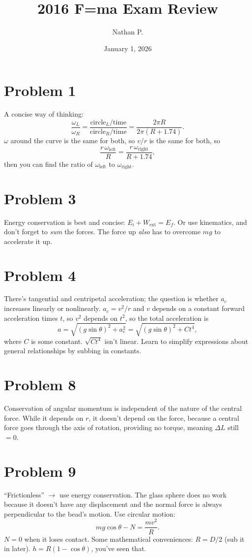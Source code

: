 \documentclass[11pt]{article}
\title{2016 F=ma Exam Review}
\author{Nathan P.}
\date{January 1, 2026}
\begin{document}
\maketitle

\section*{Problem 1}
A concise way of thinking:
\[
\frac{\omega_L}{\omega_R}=\frac{\text{circle}_L/\text{time}}{\text{circle}_R/\text{time}}=\frac{2\pi R}{2\pi(R+1.74)}.
\]
$\omega$ around the curve is the same for both, so $v/r$ is the same for both, so
\[
\frac{r\,\omega_{\text{left}}}{R}=\frac{r\,\omega_{\text{right}}}{R+1.74},
\]
then you can find the ratio of $\omega_{\text{left}}$ to $\omega_{\text{right}}$.

\section*{Problem 3}
Energy conservation is best and concise: $E_i+W_{\text{ext}}=E_f$.
Or use kinematics, and don't forget to \emph{sum} the forces. The force up \emph{also} has to overcome $mg$ to accelerate it up.

\section*{Problem 4}
There's tangential and centripetal acceleration; the question is whether $a_c$ increases linearly or nonlinearly.
$a_c=v^2/r$ and $v$ depends on a constant forward acceleration times $t$, so $v^2$ depends on $t^2$, so the total acceleration is
\[
a=\sqrt{(g\sin\theta)^2+a_c^2}=\sqrt{(g\sin\theta)^2+Ct^4},
\]
where $C$ is some constant. $\sqrt{Ct^4}$ isn't linear.
Learn to simplify expressions about general relationships by subbing in constants.

\section*{Problem 8}
Conservation of angular momentum is independent of the nature of the central force. While it depends on $r$, it doesn't depend on the force, because a central force goes through the axis of rotation, providing no torque, meaning $\Delta L$ still $=0$.

\section*{Problem 9}
``Frictionless'' $\to$ use energy conservation. The glass sphere does no work because it doesn't have any displacement and the normal force is always perpendicular to the bead's motion.
Use circular motion:
\[
mg\cos\theta-N=\frac{mv^2}{R}.
\]
$N=0$ when it loses contact.
Some mathematical conveniences: $R=D/2$ (sub it in later). $h=R(1-\cos\theta)$, you've seen that.
\end{document}

